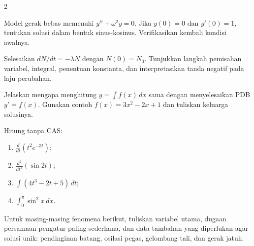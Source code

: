 \documentclass[10pt,a4paper]{article}
\newcommand{\level}[1]{\colorbox{levelbg}{\scriptsize\strut #1}}
\newcommand{\src}[1]{\colorbox{sourcebg}{\scriptsize\strut #1}}
\begin{document}
\begin{multicols}{2}
\begin{qbox}[title={M1.6: Massa-pegas\hfill \level{L2}\;\src{PR}}]
\small Model gerak bebas memenuhi $y''+\omega^2y=0$. Jika $y(0)=0$ dan $y'(0)=1$, tentukan solusi dalam bentuk sinus-kosinus. Verifikasikan kembali kondisi awalnya.
\end{qbox}
\begin{qbox}[title={M1.7: Persamaan separabel\hfill \level{L2}\;\src{Boas}}]
\small Selesaikan $dN/dt=-\lambda N$ dengan $N(0)=N_0$. Tunjukkan langkah pemisahan variabel, integral, penentuan konstanta, dan interpretasikan tanda negatif pada laju perubahan.
\end{qbox}
\begin{qbox}[title={M1.8: Integral sebagai penyelesaian PDB\hfill \level{L2}\;\src{Boas}}]
\small Jelaskan mengapa menghitung $y=\int f(x)\,dx$ sama dengan menyelesaikan PDB $y'=f(x)$. Gunakan contoh $f(x)=3x^2-2x+1$ dan tuliskan keluarga solusinya.
\end{qbox}
\begin{qbox}[title={M1.9: Refresh turunan dan integral\hfill \level{L2}\;\src{Var}}]
\small Hitung tanpa CAS:
\begin{enumerate}
\item $\frac{d}{dt}(t^2e^{-3t})$;
\item $\frac{d^2}{dt^2}(\sin 2t)$;
\item $\int (4t^3-2t+5)\,dt$;
\item $\int_0^\pi \sin^2 x\,dx$.
\end{enumerate}
\end{qbox}
\begin{qbox}[title={M1.10: Dari model ke persamaan\hfill \level{L3}\;\src{Var}}]
\small Untuk masing-masing fenomena berikut, tuliskan variabel utama, dugaan persamaan pengatur paling sederhana, dan data tambahan yang diperlukan agar solusi unik: pendinginan batang, osilasi pegas, gelombang tali, dan gerak jatuh.
\end{qbox}
\end{multicols}
\newpage
\end{document}
